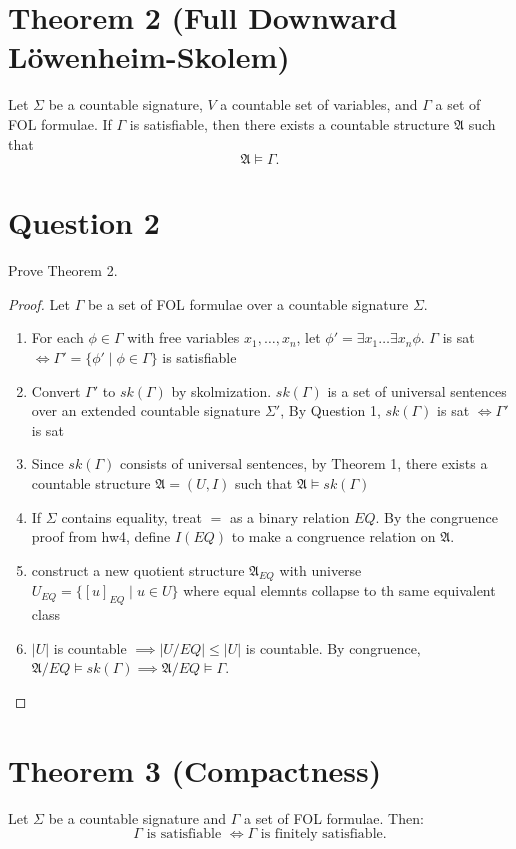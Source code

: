 \documentclass{article}
\begin{document}
\section*{Theorem 2 (Full Downward Löwenheim-Skolem)}
Let $\Sigma$ be a countable signature, $V$ a countable set of variables, and $\Gamma$ a set of FOL formulae.  
If $\Gamma$ is satisfiable, then there exists a countable structure $\mathfrak{A}$ such that
\[
\mathfrak{A} \models \Gamma.
\]

\section*{Question 2}
Prove Theorem 2.
\begin{proof}
    Let $\Gamma$ be a set of FOL formulae over a countable signature $\Sigma$.
    \begin{enumerate}
        \item For each $\phi \in \Gamma$ with free variables $x_1, \dots, x_n$, let $\phi' = \exists x_1 \dots \exists x_n \phi$. $\Gamma$ is sat $\iff \Gamma' = \{ \phi' \mid \phi \in \Gamma \}$ is satisfiable
        \item Convert $\Gamma'$ to $sk(\Gamma)$ by skolmization. 
        $sk(\Gamma)$ is a set of universal sentences over an extended countable signature $\Sigma'$, By Question 1, $sk(\Gamma)$ is sat $\iff \Gamma'$ is sat
        \item Since $sk(\Gamma)$ consists of universal sentences, by Theorem 1, there exists a countable structure $\mathfrak{A} = (U, I)$ such that $\mathfrak{A} \models sk(\Gamma)$
        \item If $\Sigma$ contains equality, treat $=$ as a binary relation $EQ$. By the congruence proof from hw4, define $I(EQ)$ to make a congruence relation on $\mathfrak{A}$. 
        \item construct a new quotient structure $\mathfrak{A}_{EQ}$ with universe $U_{EQ} = \{ [u]_{EQ} \mid u \in U \}$ where equal elemnts collapse to th same equivalent class
        \item $|U|$ is countable $\implies |U/EQ| \le |U|$ is countable. By congruence, $\mathfrak{A}/EQ \models sk(\Gamma) \implies \mathfrak{A}/EQ \models \Gamma$.
    \end{enumerate}
    \end{proof}

\section*{Theorem 3 (Compactness)}
Let $\Sigma$ be a countable signature and $\Gamma$ a set of FOL formulae. Then:
\[
\Gamma \text{ is satisfiable } \iff \Gamma \text{ is finitely satisfiable}.
\]
\end{document}
